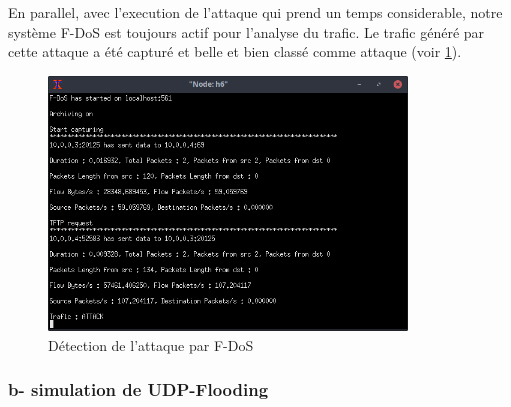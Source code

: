 En parallel, avec l'execution de l'attaque qui prend un temps considerable, notre système F-DoS est toujours actif pour l'analyse du trafic. Le trafic généré par cette attaque a été capturé et belle et bien classé comme attaque (voir \ref{fig:tftpAttack}).
\begin{figure}[h]
\centering
\includegraphics[width=0.85\textwidth]{Figures/simulation/mininet/IDS/attack_tftp}
\decoRule
\caption{Détection de l'attaque par F-DoS}
\label{fig:tftpAttack}
\end{figure}

\subsubsection{b- simulation de UDP-Flooding}

